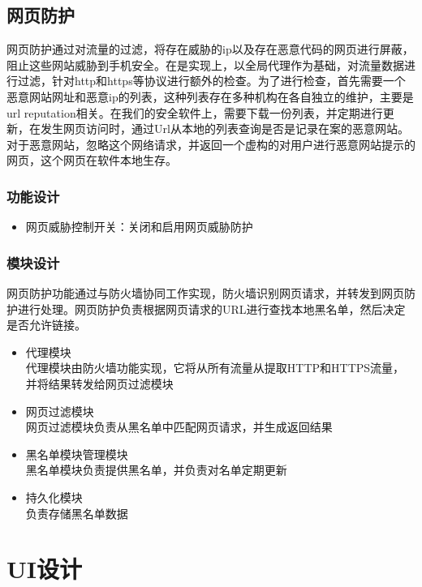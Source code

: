 \documentclass[format=final, language=chinese, degree=fyp]{hustthesis}
\begin{document}
\subsection{网页防护}

网页防护通过对流量的过滤，将存在威胁的ip以及存在恶意代码的网页进行屏蔽，阻止这些网站威胁到手机安全。在是实现上，以全局代理作为基础，对流量数据进行过滤，针对http和https等协议进行额外的检查。为了进行检查，首先需要一个恶意网站网址和恶意ip的列表，这种列表存在多种机构在各自独立的维护，主要是url reputation相关。在我们的安全软件上，需要下载一份列表，并定期进行更新，在发生网页访问时，通过Url从本地的列表查询是否是记录在案的恶意网站。对于恶意网站，忽略这个网络请求，并返回一个虚构的对用户进行恶意网站提示的网页，这个网页在软件本地生存。

\subsubsection{功能设计}

\begin{itemize}
    \item 网页威胁控制开关：关闭和启用网页威胁防护
\end{itemize}

\subsubsection{模块设计}

网页防护功能通过与防火墙协同工作实现，防火墙识别网页请求，并转发到网页防护进行处理。网页防护负责根据网页请求的URL进行查找本地黑名单，然后决定是否允许链接。

\begin{itemize}
    \item 代理模块\\ 代理模块由防火墙功能实现，它将从所有流量从提取HTTP和HTTPS流量，并将结果转发给网页过滤模块
    \item 网页过滤模块\\ 网页过滤模块负责从黑名单中匹配网页请求，并生成返回结果
    \item 黑名单模块管理模块\\ 黑名单模块负责提供黑名单，并负责对名单定期更新
    \item 持久化模块\\ 负责存储黑名单数据
\end{itemize}

\section{UI设计}
\end{document}
